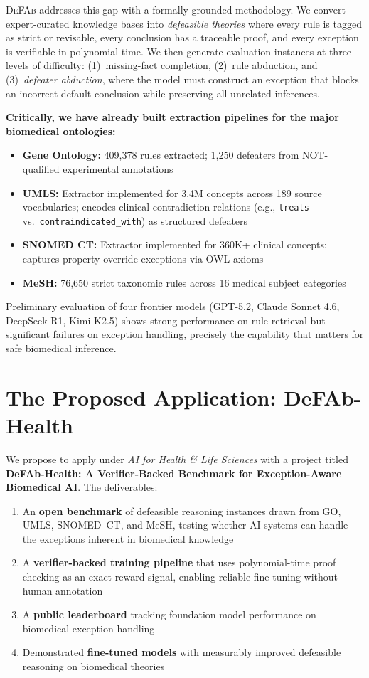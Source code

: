 \documentclass[11pt]{article}
\begin{document}
\textsc{DeFAb} addresses this gap with a formally grounded methodology. We convert expert-curated knowledge bases into \emph{defeasible theories} where every rule is tagged as strict or revisable, every conclusion has a traceable proof, and every exception is verifiable in polynomial time. We then generate evaluation instances at three levels of difficulty: (1)~missing-fact completion, (2)~rule abduction, and (3)~\emph{defeater abduction}, where the model must construct an exception that blocks an incorrect default conclusion while preserving all unrelated inferences.

\textbf{Critically, we have already built extraction pipelines for the major biomedical ontologies:}
\begin{itemize}[nosep, leftmargin=1.5em]
    \item \textbf{Gene Ontology:} 409,378 rules extracted; 1,250 defeaters from NOT-qualified experimental annotations
    \item \textbf{UMLS:} Extractor implemented for 3.4M concepts across 189 source vocabularies; encodes clinical contradiction relations (e.g., \texttt{treats} vs.\ \texttt{contraindicated\_with}) as structured defeaters
    \item \textbf{SNOMED CT:} Extractor implemented for 360K+ clinical concepts; captures property-override exceptions via OWL axioms
    \item \textbf{MeSH:} 76,650 strict taxonomic rules across 16 medical subject categories
\end{itemize}

Preliminary evaluation of four frontier models (GPT-5.2, Claude Sonnet 4.6, DeepSeek-R1, Kimi-K2.5) shows strong performance on rule retrieval but significant failures on exception handling, precisely the capability that matters for safe biomedical inference.

\section*{The Proposed Application: DeFAb-Health}

We propose to apply under \emph{AI for Health \& Life Sciences} with a project titled \textbf{DeFAb-Health: A Verifier-Backed Benchmark for Exception-Aware Biomedical AI}. The deliverables:

\begin{enumerate}[nosep, leftmargin=1.5em]
    \item An \textbf{open benchmark} of defeasible reasoning instances drawn from GO, UMLS, SNOMED~CT, and MeSH, testing whether AI systems can handle the exceptions inherent in biomedical knowledge
    \item A \textbf{verifier-backed training pipeline} that uses polynomial-time proof checking as an exact reward signal, enabling reliable fine-tuning without human annotation
    \item A \textbf{public leaderboard} tracking foundation model performance on biomedical exception handling
    \item Demonstrated \textbf{fine-tuned models} with measurably improved defeasible reasoning on biomedical theories
\end{enumerate}
\end{document}
